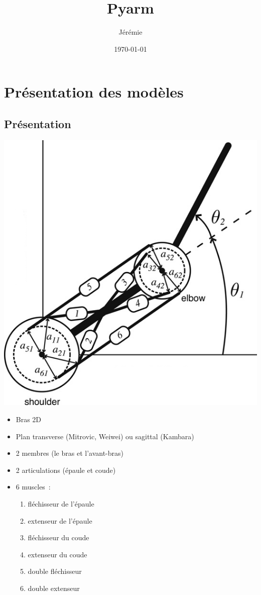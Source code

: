 \documentclass[pdftex,a4paper,11pt]{article}
\numberwithin{equation}{subsection}
\begin{document}
\title{Pyarm}
\author{
	Jérémie 
}
\date{\today{}}

\maketitle


\section{Présentation des modèles}

\subsection{Présentation}

\begin{center}
        \includegraphics[width=.40\linewidth]{fig/arm}
\end{center}

\begin{itemize}
    \item Bras 2D
    \item Plan transverse (Mitrovic, Weiwei) ou sagittal (Kambara)
    \item 2 membres (le bras et l'avant-bras) %
    \item 2 articulations (épaule et coude)
    \item 6 muscles~:
    \begin{enumerate}
        \item fléchisseur de l'épaule
        \item extenseur de l'épaule
        \item fléchisseur du coude
        \item extenseur du coude
        \item double fléchisseur
        \item double extenseur
    \end{enumerate}
\end{itemize}
\end{document}
